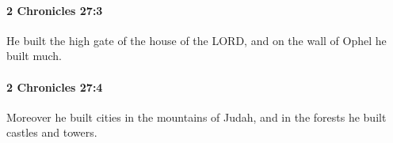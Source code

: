 		\paragraph{2 Chronicles 27:3} %
			\label{2CHRONICLES-27-3}

			He built the high gate of the house of the LORD, and on the wall of Ophel he built much.


		\paragraph{2 Chronicles 27:4} %
			\label{2CHRONICLES-27-4}

			Moreover he built cities in the mountains of Judah, and in the forests he built castles and towers.


